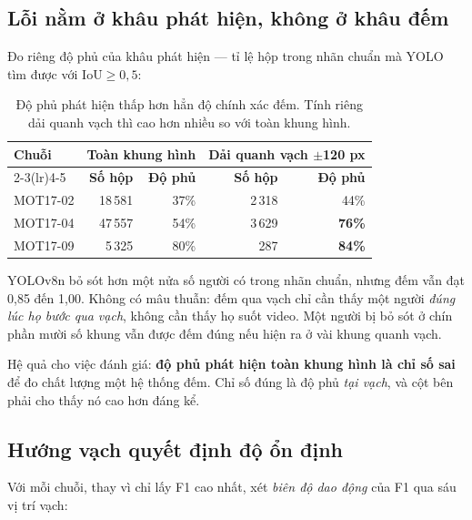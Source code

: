 \subsection{Lỗi nằm ở khâu phát hiện, không ở khâu đếm}

Đo riêng độ phủ của khâu phát hiện --- tỉ lệ hộp trong nhãn chuẩn mà YOLO tìm được với
$\mathrm{IoU} \geq 0{,}5$:

\begin{table}[H]
\centering
\caption{Độ phủ phát hiện thấp hơn hẳn độ chính xác đếm. Tính riêng dải quanh vạch thì
cao hơn nhiều so với toàn khung hình.}
\label{tab:mot17-phathien}
\small
\begin{tabularx}{\textwidth}{@{}Xrrrr@{}}
\toprule
\multirow{2}{*}{\textbf{Chuỗi}} & \multicolumn{2}{c}{\textbf{Toàn khung hình}} &
\multicolumn{2}{c}{\textbf{Dải quanh vạch $\pm$120 px}} \\
\cmidrule(lr){2-3}\cmidrule(lr){4-5}
 & \textbf{Số hộp} & \textbf{Độ phủ} & \textbf{Số hộp} & \textbf{Độ phủ} \\
\midrule
MOT17-02 & 18\,581 & 37\% & 2\,318 & 44\% \\
MOT17-04 & 47\,557 & 54\% & 3\,629 & \textbf{76\%} \\
MOT17-09 &  5\,325 & 80\% &   287 & \textbf{84\%} \\
\bottomrule
\end{tabularx}
\end{table}

YOLOv8n bỏ sót hơn một nửa số người có trong nhãn chuẩn, nhưng đếm vẫn đạt 0{,}85 đến
1{,}00. Không có mâu thuẫn: đếm qua vạch chỉ cần thấy một người \emph{đúng lúc họ bước
qua vạch}, không cần thấy họ suốt video. Một người bị bỏ sót ở chín phần mười số khung
vẫn được đếm đúng nếu hiện ra ở vài khung quanh vạch.

Hệ quả cho việc đánh giá: \textbf{độ phủ phát hiện toàn khung hình là chỉ số sai} để đo
chất lượng một hệ thống đếm. Chỉ số đúng là độ phủ \emph{tại vạch}, và cột bên phải cho
thấy nó cao hơn đáng kể.

\subsection{Hướng vạch quyết định độ ổn định}
\label{sub:huongvach}

Với mỗi chuỗi, thay vì chỉ lấy F1 cao nhất, xét \emph{biên độ dao động} của F1 qua sáu
vị trí vạch:

